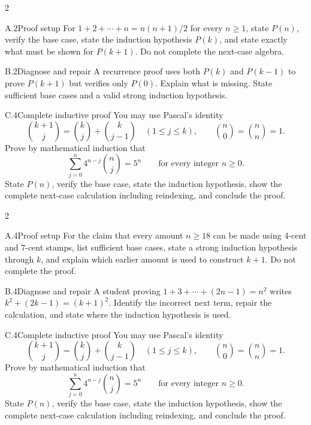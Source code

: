\documentclass[9pt]{extarticle}
\begin{document}
\CoreWorkArea
\FormBreak
{}
\begin{multicols}{2}
\begin{CompactCoreProblem}{A.2}{Proof setup}
For $1+2+\cdots+n=n(n+1)/2$ for every $n\ge1$, state $P(n)$, verify the base case, state the induction hypothesis $P(k)$, and state exactly what must be shown for $P(k+1)$. Do not complete the next-case algebra.
\end{CompactCoreProblem}
\begin{CompactCoreProblem}{B.2}{Diagnose and repair}
A recurrence proof uses both $P(k)$ and $P(k-1)$ to prove $P(k+1)$ but verifies only $P(0)$. Explain what is missing. State sufficient base cases and a valid strong induction hypothesis.
\end{CompactCoreProblem}
\end{multicols}
\begin{CompactCoreProblem}{C.4}{Complete inductive proof}
You may use Pascal's identity
\[
\binom{k+1}{j}=\binom{k}{j}+\binom{k}{j-1}
\quad(1\le j\le k),\qquad
\binom{n}{0}=\binom{n}{n}=1.
\]
Prove by mathematical induction that
\[
\sum_{j=0}^{n} 4^{n-j}\binom{n}{j}=5^n\qquad\text{for every integer }n\ge0.
\]
State $P(n)$, verify the base case, state the induction hypothesis, show the complete next-case calculation including reindexing, and conclude the proof.
\end{CompactCoreProblem}
\CoreWorkArea
\FormBreak
{}
\begin{multicols}{2}
\begin{CompactCoreProblem}{A.4}{Proof setup}
For the claim that every amount $n\ge18$ can be made using 4-cent and 7-cent stamps, list sufficient base cases, state a strong induction hypothesis through $k$, and explain which earlier amount is used to construct $k+1$. Do not complete the proof.
\end{CompactCoreProblem}
\begin{CompactCoreProblem}{B.4}{Diagnose and repair}
A student proving $1+3+\cdots+(2n-1)=n^2$ writes $k^2+(2k-1)=(k+1)^2$. Identify the incorrect next term, repair the calculation, and state where the induction hypothesis is used.
\end{CompactCoreProblem}
\end{multicols}
\begin{CompactCoreProblem}{C.4}{Complete inductive proof}
You may use Pascal's identity
\[
\binom{k+1}{j}=\binom{k}{j}+\binom{k}{j-1}
\quad(1\le j\le k),\qquad
\binom{n}{0}=\binom{n}{n}=1.
\]
Prove by mathematical induction that
\[
\sum_{j=0}^{n} 4^{n-j}\binom{n}{j}=5^n\qquad\text{for every integer }n\ge0.
\]
State $P(n)$, verify the base case, state the induction hypothesis, show the complete next-case calculation including reindexing, and conclude the proof.
\end{CompactCoreProblem}
\end{document}
